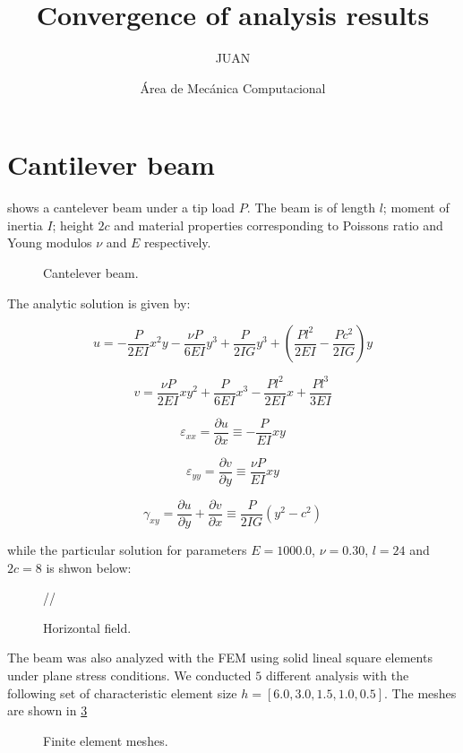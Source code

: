 \documentclass[12pt,letterpaper]{article}
\author{JUAN}
\author{Área de Mecánica Computacional}
\title{\textbf{Convergence of analysis results}}
\begin{document}
\maketitle
\section{Cantilever beam}
 shows a cantelever beam under a tip load $P$. The beam is of length $l$; moment of inertia $I$; height $2c$ and material properties corresponding to Poissons ratio and Young modulos $\nu$ and $E$ respectively.

\begin{figure}[H]
\centering
{}
\caption{Cantelever beam.}
\label{fig:viga}
\end{figure}

The analytic solution \citep{book:timoshenko} is given by:

\[u =  - \frac{P}{{2EI}}{x^2}y - \frac{{\nu P}}{{6EI}}{y^3} + \frac{P}{{2IG}}{y^3} + \left( {\frac{{P{l^2}}}{{2EI}} - \frac{{P{c^2}}}{{2IG}}} \right)y\]

\[v = \frac{{\nu P}}{{2EI}}x{y^2} + \frac{P}{{6EI}}{x^3} - \frac{{P{l^2}}}{{2EI}}x + \frac{{P{l^3}}}{{3EI}}\]

\[{\varepsilon _{xx}} = \frac{{\partial u}}{{\partial x}} \equiv  - \frac{P}{{EI}}xy\]

\[{\varepsilon _{yy}} = \frac{{\partial v}}{{\partial y}} \equiv \frac{{\nu P}}{{EI}}xy\]

\[{\gamma _{xy}} = \frac{{\partial u}}{{\partial y}} + \frac{{\partial v}}{{\partial x}} \equiv \frac{P}{{2IG}}\left( {{y^2} - {c^2}} \right)\]

while the particular solution for parameters $E=1000.0$, $\nu=0.30$, $l=24$ and $2c=8$ is shwon below:

\begin{figure}[H]
\centering
{}//
\caption{Horizontal field.}
\label{fig:ecuacion}
\end{figure}

The beam was also analyzed with the FEM using solid lineal square elements under plane stress conditions. We conducted $5$ different analysis with the following set of characteristic element size $h=[6.0,3.0,1.5,1.0,0.5]$. The meshes are shown in \cref{fig:mallas}

\begin{figure}[H]
\centering
{}
\caption{Finite element meshes.}
\label{fig:mallas}
\end{figure}
\end{document}
